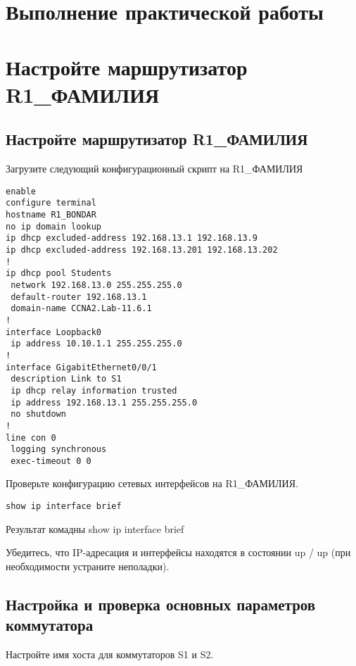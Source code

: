 \section*{\LARGE Выполнение практической работы}

\section{Настройте маршрутизатор R1\_ФАМИЛИЯ}

\subsection{Настройте маршрутизатор R1\_ФАМИЛИЯ}

Загрузите следующий конфигурационный скрипт на R1\_ФАМИЛИЯ

\begin{verbatim}
enable
configure terminal
hostname R1_BONDAR
no ip domain lookup
ip dhcp excluded-address 192.168.13.1 192.168.13.9
ip dhcp excluded-address 192.168.13.201 192.168.13.202
!
ip dhcp pool Students
 network 192.168.13.0 255.255.255.0
 default-router 192.168.13.1
 domain-name CCNA2.Lab-11.6.1
!
interface Loopback0
 ip address 10.10.1.1 255.255.255.0
!
interface GigabitEthernet0/0/1
 description Link to S1
 ip dhcp relay information trusted
 ip address 192.168.13.1 255.255.255.0
 no shutdown
!
line con 0
 logging synchronous
 exec-timeout 0 0
\end{verbatim}

Проверьте конфигурацию сетевых интерфейсов на R1\_ФАМИЛИЯ.

\begin{verbatim}
show ip interface brief
\end{verbatim}

\begin{image}
	\caption{Результат комадны show ip interface brief}
\end{image}

Убедитесь, что IP-адресация и интерфейсы находятся
в состоянии up / up (при необходимости устраните неполадки).

\subsection{Настройка и проверка основных параметров коммутатора}

Настройте имя хоста для коммутаторов S1 и S2.

